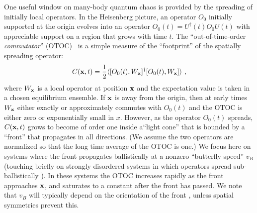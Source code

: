 \documentclass[aps,prl,reprint,superscriptaddress, longbibliography]{revtex4-1}
\begin{document}
One useful window on many-body quantum chaos is provided by the spreading of initially local operators.  In the Heisenberg picture, an operator $O_0$  initially supported at the origin evolves into an operator ${O_0(t) = U^\dagger(t) O_0 U(t)}$ with appreciable support on a region that grows with time $t$.  The ``out-of-time-order {\it commutator}'' (OTOC)~\cite{Lieb72,Larkinotoc,KitaevSYK,chaosbound,HosurYoshida,ShenkerStanfordButterfly,LocalizedShocks,CotlerRM,RobertsStanford,GuQiStanford,GuQi_rcft,StanfordWeakCoupling,PatelDiffusiveMetal,ChowdhuryON,Galitski_lyapunov,DoraMoessner,LuitzScrambling,ProsenWeakChaos,AleinerOTOC,MotrunichTFIM_otoc,FradkinHuse,ChalkerFloquetChaos,FawziScrambling,opspreadAdam, opspreadCurt, TiborCons, KhemaniCons} is a simple measure of the ``footprint'' of the spatially spreading operator:
\begin{equation}
{C}({\bf x},t) = \frac{1}{2} \langle [O_0(t), W_{\bf{x}}]^\dagger [O_0(t), W_{\bf{x}}] \rangle~,
\label{eq:otoc}
\end{equation} 
where $W_{\bf x}$ is a local operator at position $\bf x$ and the expectation value is taken in a chosen equilibrium ensemble. If $\bf{x}$ is away from the origin, then at early times $W_{\bf{x}}$ either exactly or approximately commutes with $O_0(t)$ and the OTOC is either zero or exponentially small in $x$.  However, as the operator $O_0(t)$ spreads, ${C}({\bf x},t)$ grows to become of order one inside a``light cone'' that is bounded by a ``front'' that propagates in all directions.  (We assume the two operators are normalized so that the long time average of the OTOC is one.)
We focus here on systems where the front propagates ballistically at a nonzero ``butterfly speed'' $v_B$ (touching briefly on strongly disordered systems in which operators spread sub-ballistically \cite{Znidaric, BardarsonPollmannMoore, PVP, VHA, NahumRuhmanHuse}). 
In these systems the OTOC increases rapidly as the front approaches $\bf{x}$, and saturates to a constant after the front has passed. We note that $v_B$ will typically depend on the orientation of the front  \cite{opspreadAdam}, unless spatial symmetries prevent this.  
\end{document}
